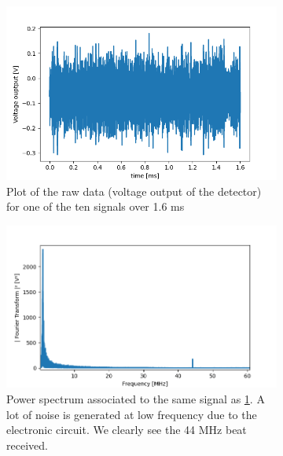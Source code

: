 \documentclass[11pt]{report}
\begin{document}
\begin{figure}[h!]
\centering
\begin{subfigure}{.48\textwidth}
  \centering
  \includegraphics[width=1.1\linewidth]{st-f-rough}
  \caption{Plot of the raw data (voltage output of the detector) for one of the ten signals over 1.6 ms}
  \label{fig:st-f-rough}
\end{subfigure}%
\hspace{1em}%
\begin{subfigure}{.48\textwidth}
  \centering
  \includegraphics[width=1.1\linewidth]{st-fft-rough}
  \caption{Power spectrum associated to the same signal as \ref{fig:st-f-rough}. A lot of noise is generated at low frequency due to the electronic circuit. We clearly see the 44 MHz beat received.}
  \label{fig:st-fft-rough}
\end{subfigure}
\caption{}
\end{figure}
\end{document}
